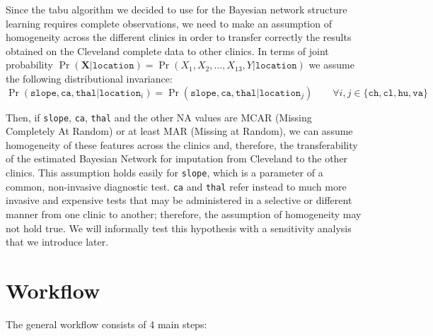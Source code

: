 \documentclass[11pt, a4paper]{article}
\begin{document}
	Since the tabu algorithm we decided to use for the Bayesian network structure learning \cite{nagarajan2013bayesian}\cite{scutari2010learning} requires complete observations, we need to make an assumption of homogeneity across the different clinics in order to transfer correctly the results obtained on the Cleveland complete data to other clinics. In terms of joint probability $\Pr (\mathbf{X}|\texttt{location})= \Pr(X_1,X_2,\dots,X_{13},Y|\texttt{location})$ we assume the following distributional invariance:
	\[
	\Pr (\texttt{slope}, \texttt{ca}, \texttt{thal}|\texttt{location}_i)= \Pr (\texttt{slope}, \texttt{ca}, \texttt{thal}|\texttt{location}_j) \qquad \forall i,j \in\{\texttt{ch}, \texttt{cl}, \texttt{hu}, \texttt{va}\}
	\]
	
	Then, if \texttt{slope}, \texttt{ca}, \texttt{thal} and the other NA values are MCAR (Missing Completely At Random) or at least MAR (Missing at Random), we can assume homogeneity of these features across the clinics and, therefore, the transferability of the estimated Bayesian Network for imputation from Cleveland to the other clinics. This assumption holds easily for \texttt{slope}, which is a parameter of a common, non-invasive diagnostic test. \texttt{ca} and \texttt{thal} refer instead to much more invasive and expensive tests that may be administered in a selective or different manner from one clinic to another; therefore, the assumption of homogeneity may not hold true. We will informally test this hypothesis with a sensitivity analysis that we introduce later. 
	
	\section{Workflow}
	The general workflow consists of 4 main steps:
	
\end{document}
